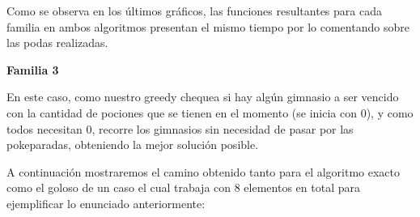 \begin{figure} 
 \centering
       \label{fig:fam1medicion}
    \label{fig:fam2medicion}
    \end{figure}


Como se observa en los \'ultimos gr\'aficos, las funciones resultantes para cada familia en ambos algoritmos presentan el mismo tiempo por lo comentando sobre las podas realizadas.

\begin{center}
\textbf{Familia 3}
\end{center}

En este caso, como nuestro greedy chequea si hay alg\'un gimnasio a ser vencido con la cantidad de pociones que se tienen en el momento (se inicia con 0), y como todos necesitan 0, recorre los gimnasios sin necesidad de pasar por las pokeparadas, obteniendo la mejor soluci\'on posible.

A continuaci\'on mostraremos el camino obtenido tanto para el algoritmo exacto como el goloso de un caso el cual trabaja con 8 elementos en total para ejemplificar lo enunciado anteriormente:

